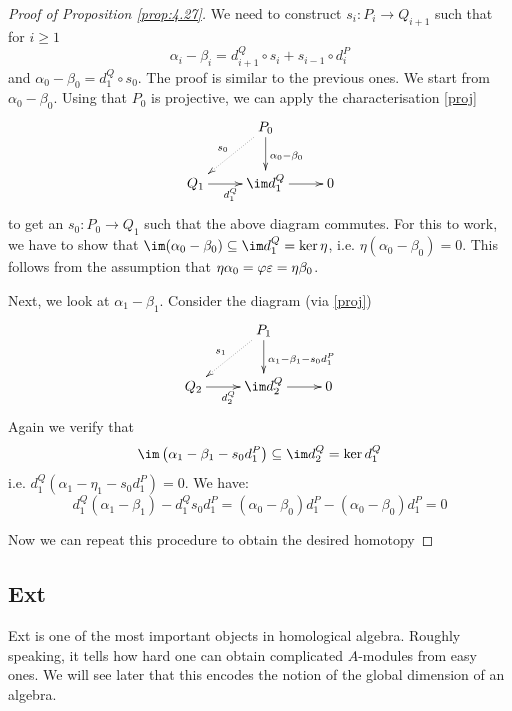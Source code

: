 \documentclass[twoside = false,	%
		headsepline,		%
		parskip = true,
		]{scrbook}						%
\begin{document}
    \begin{proof}[Proof of Proposition \ref{prop:4.27}]
        We need to construct $s_i:P_i \to Q_{i+1}$ such that for $i \geq 1$
        \begin{equation*}
            \alpha_i - \beta_i = d_{i+1}^Q \circ s_i + s_{i-1} \circ d_i^P
        \end{equation*}
        and $\alpha_0 - \beta_ 0 = d_1^Q \circ s_0$. The proof is similar to the previous ones. We start from $\alpha_0 - \beta_0$. Using that $P_0$ is projective, we can apply the characterisation \ref{proj}
        \begin{equation*}
        \xymatrix {
            & P_0 \ar[d]^{\alpha_0 - \beta_0} \ar@{.>}[dl]_{s_0} \\
            Q_1 \ar[r]_{d_1^Q} & \im d_1^Q \ar[r] & 0
        }
        \end{equation*}
        to get an $s_0: P_0 \to Q_1$ such that the above diagram commutes. For this to work, we have to show that $\im (\alpha_0 - \beta_0) \subseteq \im d_1^Q = \ker \eta$, i.e. $\eta(\alpha_0 - \beta_0) = 0$. This follows from the assumption that $\eta \alpha_0 = \varphi \varepsilon = \eta \beta_0$.

        Next, we look at $\alpha_1 - \beta_1$. Consider the diagram (via \ref{proj})
        \begin{equation*}
        \xymatrix {
            & P_1 \ar[d]^{\alpha_1 - \beta_1 - s_0 d_1^P} \ar@{.>}[dl]_{s_1} \\
            Q_2 \ar[r]_{d_2^Q} & \im d_2^Q \ar[r] & 0
        }
        \end{equation*}
        Again we verify that
        \begin{equation*}
            \im \round{\alpha_1 - \beta_1 - s_0 d_1^P} \subseteq \im d_2^Q = \ker d_1^Q
        \end{equation*}
        i.e. $d_1^Q(\alpha_1 - \eta_1 - s_0 d_1^P) = 0$. We have:
        \begin{equation*}
            d_1^Q(\alpha_1 - \beta_1) - d_1^Q s_0 d_1^P = (\alpha_0 - \beta_0)d_1^P - (\alpha_0 - \beta_0) d_1^P = 0
        \end{equation*}

        Now we can repeat this procedure to obtain the desired homotopy
    \end{proof}

\subsection{Ext}
    Ext is one of the most important objects in homological algebra. Roughly speaking, it tells how hard one can obtain complicated $A$-modules from easy ones. We will see later that this encodes the notion of the global dimension of an algebra.
\end{document}
